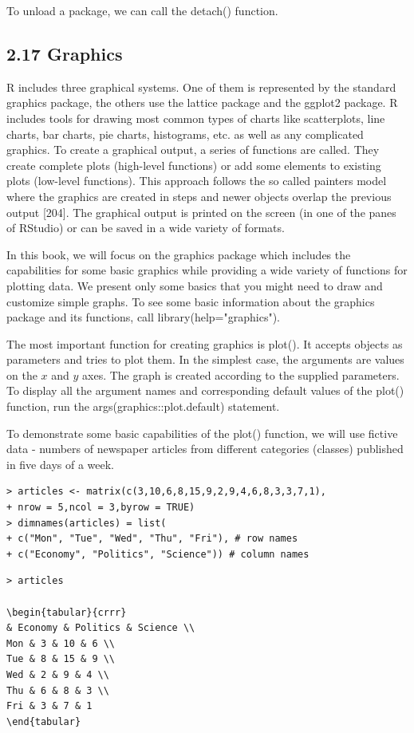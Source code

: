 \documentclass[10pt]{book}
\begin{document}
To unload a package, we can call the detach() function.

\subsection*{2.17 Graphics}
R includes three graphical systems. One of them is represented by the standard graphics package, the others use the lattice package and the ggplot2 package. R includes tools for drawing most common types of charts like scatterplots, line charts, bar charts, pie charts, histograms, etc. as well as any complicated graphics. To create a graphical output, a series of functions are called. They create complete plots (high-level functions) or add some elements to existing plots (low-level functions). This approach follows the so called painters model where the graphics are created in steps and newer objects overlap the previous output [204]. The graphical output is printed on the screen (in one of the panes of RStudio) or can be saved in a wide variety of formats.

In this book, we will focus on the graphics package which includes the capabilities for some basic graphics while providing a wide variety of functions for plotting data. We present only some basics that you might need to draw and customize simple graphs. To see some basic information about the graphics package and its functions, call library(help="graphics").

The most important function for creating graphics is plot(). It accepts objects as parameters and tries to plot them. In the simplest case, the arguments are values on the $x$ and $y$ axes. The graph is created according to the supplied parameters. To display all the argument names and corresponding default values of the plot() function, run the args(graphics::plot.default) statement.

To demonstrate some basic capabilities of the plot() function, we will use fictive data - numbers of newspaper articles from different categories (classes) published in five days of a week.

\begin{verbatim}
> articles <- matrix(c(3,10,6,8,15,9,2,9,4,6,8,3,3,7,1),
+ nrow = 5,ncol = 3,byrow = TRUE)
> dimnames(articles) = list(
+ c("Mon", "Tue", "Wed", "Thu", "Fri"), # row names
+ c("Economy", "Politics", "Science")) # column names
\end{verbatim}

\begin{verbatim}
> articles

\begin{tabular}{crrr} 
& Economy & Politics & Science \\
Mon & 3 & 10 & 6 \\
Tue & 8 & 15 & 9 \\
Wed & 2 & 9 & 4 \\
Thu & 6 & 8 & 3 \\
Fri & 3 & 7 & 1
\end{tabular}
\end{verbatim}
\end{document}
